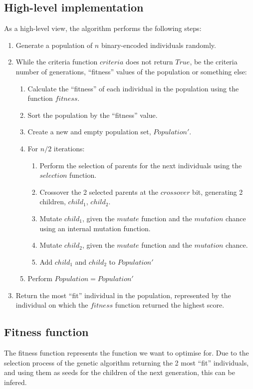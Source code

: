 \documentclass[conference]{IEEEtran}
\begin{document}
\subsection{High-level implementation}
As a high-level view, the algorithm performs the following steps:
\begin{enumerate}
    \item Generate a population of $n$ binary-encoded individuals randomly.
    \item While the criteria function $criteria$ does not return $True$, be the criteria number of generations, ``fitness'' values of the population or something else:
    \begin{enumerate}
        \item Calculate the ``fitness'' of each individual in the population using the function $fitness$.
        \item Sort the population by the ``fitness'' value.
        \item Create a new and empty population set, $Population'$.
        \item For $n / 2$ iterations:
        \begin{enumerate}
            \item Perform the selection of parents for the next individuals using the $selection$ function.
            \item Crossover the 2 selected parents at the $crossover$ bit, generating 2 children, $child_1$, $child_2$.
            \item Mutate $child_1$, given the $mutate$ function and the $mutation$ chance using an internal mutation function.
            \item Mutate $child_2$, given the $mutate$ function and the $mutation$ chance.
            \item Add $child_1$ and $child_2$ to $Population'$
        \end{enumerate}
        \item Perform $Population = Population'$
    \end{enumerate}
    \item Return the most ``fit'' individual in the population, represented by the individual on which the $fitness$ function returned the highest score.
\end{enumerate}

\subsection{Fitness function}
The fitness function represents the function we want to optimise for. Due to the selection process of the genetic
algorithm returning the 2 most ``fit'' individuals, and using them as seeds for the children of the next generation,
this can be infered.
\end{document}
